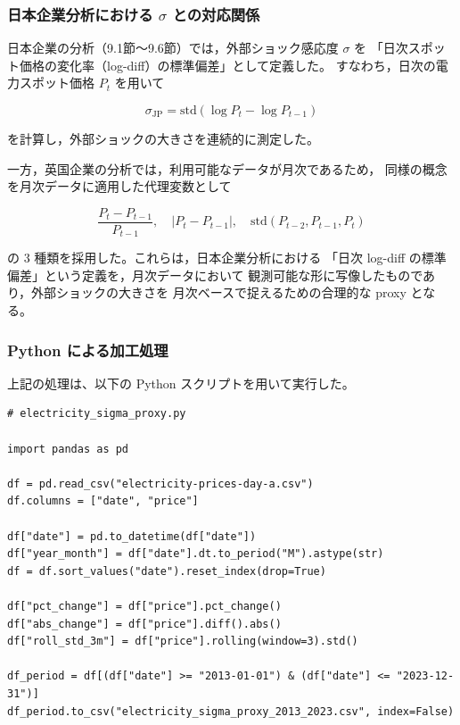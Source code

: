 \subsubsection*{日本企業分析における $\sigma$ との対応関係}

日本企業の分析（9.1節～9.6節）では，外部ショック感応度 $\sigma$ を
「日次スポット価格の変化率（log-diff）の標準偏差」として定義した。
すなわち，日次の電力スポット価格 $P_t$ を用いて



\[
\sigma_{\text{JP}} = \mathrm{std}\left( \log P_t - \log P_{t-1} \right)
\]



を計算し，外部ショックの大きさを連続的に測定した。

一方，英国企業の分析では，利用可能なデータが月次であるため，
同様の概念を月次データに適用した代理変数として



\[
\frac{P_t - P_{t-1}}{P_{t-1}},\quad |P_t - P_{t-1}|,\quad
\mathrm{std}(P_{t-2}, P_{t-1}, P_t)
\]



の 3 種類を採用した。これらは，日本企業分析における
「日次 log-diff の標準偏差」という定義を，月次データにおいて
観測可能な形に写像したものであり，外部ショックの大きさを
月次ベースで捉えるための合理的な proxy となる。

\subsubsection*{Python による加工処理}

上記の処理は、以下の Python スクリプトを用いて実行した。

\begin{verbatim}
# electricity_sigma_proxy.py

import pandas as pd

df = pd.read_csv("electricity-prices-day-a.csv")
df.columns = ["date", "price"]

df["date"] = pd.to_datetime(df["date"])
df["year_month"] = df["date"].dt.to_period("M").astype(str)
df = df.sort_values("date").reset_index(drop=True)

df["pct_change"] = df["price"].pct_change()
df["abs_change"] = df["price"].diff().abs()
df["roll_std_3m"] = df["price"].rolling(window=3).std()

df_period = df[(df["date"] >= "2013-01-01") & (df["date"] <= "2023-12-31")]
df_period.to_csv("electricity_sigma_proxy_2013_2023.csv", index=False)
\end{verbatim}

